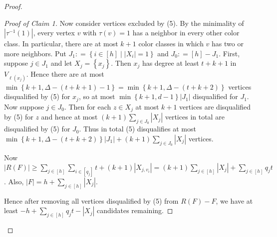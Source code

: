 \documentclass[12pt]{article}
\theoremstyle{plain}
\theoremstyle{definition}
\theoremstyle{remark}
\newcommand{\set}[1]{\left\{ #1 \right\}}
\newcommand{\setb}[3]{\left\{ #1 \in #2 \mid #3 \right\}}
\newcommand{\card}[1]{\left|#1\right|}
\newcommand{\irange}[1]{\left[#1\right]}
\newcommand{\DefinedAs}{\mathrel{\mathop:}=}
\begin{document}
\begin{proof}
\begin{proof}[Proof of Claim 1]
Now consider vertices excluded by (5).  By the minimality of $\card{\tau^{-1}(1)}$, every vertex $v$ with $\tau(v) = 1$ has a neighbor in every other color class.  In particular, there are at most $k+1$ color classes in which $v$ has two or more neighbors. Put $J_1 \DefinedAs \setb{i}{\irange{h}}{|X_i| = 1}$ and $J_0 \DefinedAs \irange{h} - J_1$.  First, suppose $j \in J_1$ and let $X_j = \set{x_j}$.  Then $x_j$ has degree at least $t + k + 1$ in $V_{\ell(x_j)}$. Hence there are at most $\min\set{k+1, \Delta - (t + k + 1) - 1} = \min\set{k+1, \Delta - (t + k + 2)}$ vertices disqualified by (5) for $x_j$, so at most $\min\set{k+1, d-1}\card{J_1}$ disqualified for $J_1$.  Now suppose $j \in J_0$. Then for each $z \in X_j$ at most $k+1$ vertices are disqualified by (5) for $z$ and hence at most $(k+1)\sum_{j \in J_0} \card{X_j}$ vertices in total are disqualified by (5) for $J_0$.  Thus in total (5) disqualifies at most $\min\set{k+1, \Delta - (t + k + 2)}\card{J_1} + (k+1)\sum_{j \in J_0} \card{X_j}$ vertices.

Now $\card{R(F)} \ge \sum_{j \in \irange{h}} \sum_{i \in \irange{q_j}} t + (k+1)\card{X_{j, v_i}} = (k+1) \sum_{j \in \irange{h}} |X_j| + \sum_{j \in \irange{h}} q_jt$.  Also, $|F| = h + \sum_{j \in \irange{h}} |X_j|$.  

Hence after removing all vertices disqualified by (5) from $R(F) - F$, we have at least $-h + \sum_{j \in \irange{h}} q_jt - |X_j|$ candidates remaining.
\end{proof}

\end{proof}
\end{document}
